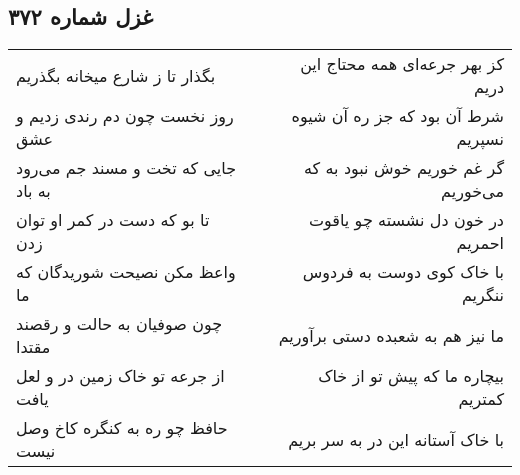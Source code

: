 \begin{center}
\section*{غزل شماره ۳۷۲}
\label{sec:sh372}
\begin{longtable}{l p{0.5cm} r}
بگذار تا ز شارع میخانه بگذریم
&&
کز بهر جرعه‌ای همه محتاج این دریم
\\
روز نخست چون دم رندی زدیم و عشق
&&
شرط آن بود که جز ره آن شیوه نسپریم
\\
جایی که تخت و مسند جم می‌رود به باد
&&
گر غم خوریم خوش نبود به که می‌خوریم
\\
تا بو که دست در کمر او توان زدن
&&
در خون دل نشسته چو یاقوت احمریم
\\
واعظ مکن نصیحت شوریدگان که ما
&&
با خاک کوی دوست به فردوس ننگریم
\\
چون صوفیان به حالت و رقصند مقتدا
&&
ما نیز هم به شعبده دستی برآوریم
\\
از جرعه تو خاک زمین در و لعل یافت
&&
بیچاره ما که پیش تو از خاک کمتریم
\\
حافظ چو ره به کنگره کاخ وصل نیست
&&
با خاک آستانه این در به سر بریم
\\
\end{longtable}
\end{center}
